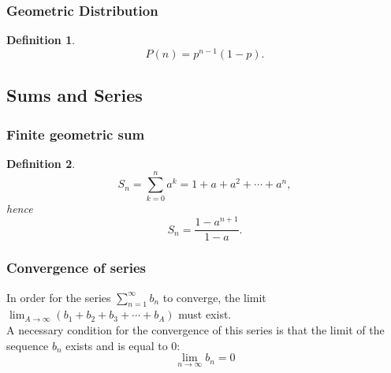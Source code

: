 \documentclass{article}
\newtheorem{definition}{Definition}
\begin{document}
\subsubsection{Geometric Distribution}
\begin{definition}
    \begin{equation}
        P(n) = p^{n-1}(1-p).
    \end{equation}
\end{definition}


\subsection{Sums and Series}
\subsubsection{Finite geometric sum}
\begin{definition}
    \begin{equation}
        S_n=\sum_{k=0}^n a^k= 1+a+a^2+\cdots+a^n,
    \end{equation}
    hence
    \begin{equation}
        S_n = \frac{1-a^{n+1}}{1-a}.
    \end{equation}
\end{definition}
\subsubsection{Convergence of series}
In order for the series $\sum_{n=1}^\infty b_n$ to converge, the limit $\lim_{A\to\infty}(b_1+b_2+b_3+\cdots+b_A)$ must exist. \\
A necessary condition for the convergence of this series is that the limit of the sequence $b_n$ exists and is equal to $0$:
\begin{equation}
    \lim_{n\to\infty} b_n=0
\end{equation}
\end{document}
